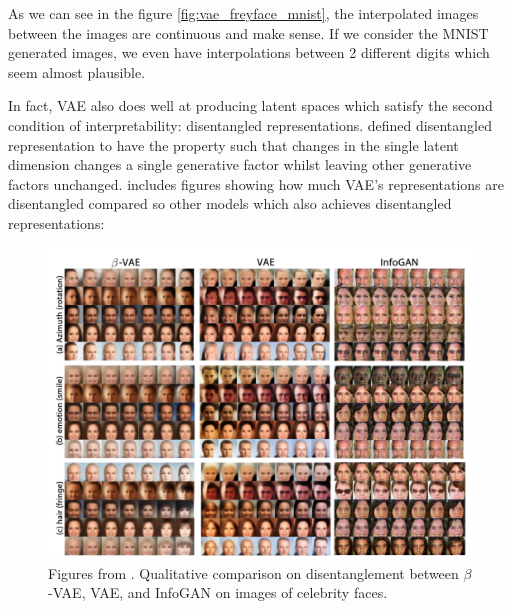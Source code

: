                 As we can see in the figure \ref{fig:vae_freyface_mnist}, the interpolated images between the images are continuous and make sense. If we consider the MNIST generated images, we even have interpolations between 2 different digits which seem almost plausible.
                
                In fact, VAE also does well at producing latent spaces which satisfy the second condition of interpretability: disentangled representations. \cite{bengio2013representation} defined disentangled representation to have the property such that changes in the single latent dimension changes a single generative factor whilst leaving other generative factors unchanged. \cite{higgins2016beta} includes figures showing how much VAE's representations are disentangled compared so other models which also achieves disentangled representations:
                
                \begin{figure}[H] \label{fig:celeba}
                    \centering
                    \includegraphics[width=1\textwidth]{imgs/celeba.png}
                    \caption{Figures from \cite{higgins2016beta}. Qualitative comparison on disentanglement between $\beta$-VAE\citep{higgins2016beta}, VAE\citep{kingma2014adam}, and InfoGAN\citep{chen2016infogan} on images of celebrity faces.}
                \end{figure}    
                
